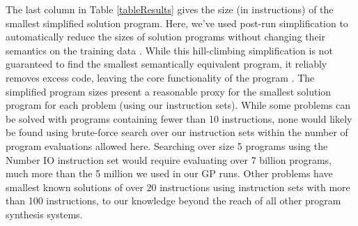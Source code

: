\documentclass{sig-alternate}
\begin{document}
The last column in Table \ref{tableResults} gives the size (in instructions) of the  smallest simplified solution program. Here, we've used post-run simplification to automatically reduce the sizes of solution programs without changing their semantics on the training data \cite{Spector:2014:GECCOcomp}. While this hill-climbing simplification is not guaranteed to find the smallest semantically equivalent program, it reliably removes excess code, leaving the core functionality of the program \cite{Spector:2014:GECCOcomp}. The simplified program sizes present a reasonable proxy for the smallest solution program for each problem (using our instruction sets). While some problems can be solved with programs containing fewer than 10 instructions, none would likely be found using brute-force search over our instruction sets within the number of program evaluations allowed here. Searching over size 5 programs using the Number IO instruction set would require evaluating over 7 billion programs, much more than the 5 million we used in our GP runs. Other problems have smallest known solutions of over 20 instructions using instruction sets with more than 100 instructions, to our knowledge beyond the reach of all other program synthesis systems.



\end{document}
